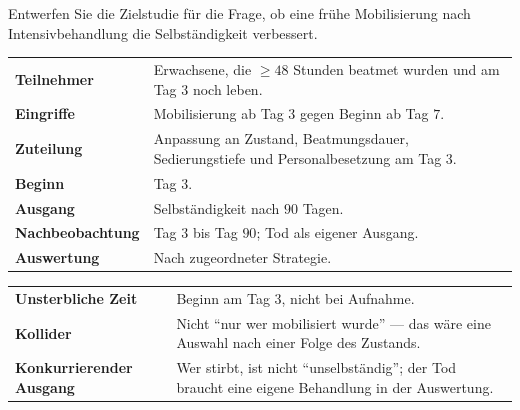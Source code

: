 \begin{aufgabe}
Entwerfen Sie die Zielstudie für die Frage, ob eine frühe Mobilisierung nach Intensivbehandlung die Selbständigkeit verbessert.

\loesung
{}
\begin{center}
{\small
\renewcommand{\arraystretch}{1.52}
\begin{tabular}{@{}P{3.0cm}P{5.6cm}@{}}
\toprule
\textbf{Teilnehmer} & Erwachsene, die $\ge 48$ Stunden beatmet wurden und am Tag $3$ noch leben.\\
\textbf{Eingriffe} & Mobilisierung ab Tag $3$ gegen Beginn ab Tag $7$.\\
\textbf{Zuteilung} & Anpassung an Zustand, Beatmungsdauer, Sedierungstiefe und Personalbesetzung am Tag $3$.\\
\textbf{Beginn} & Tag $3$.\\
\textbf{Ausgang} & Selbständigkeit nach $90$ Tagen.\\
\textbf{Nachbeobachtung} & Tag $3$ bis Tag $90$; Tod als eigener Ausgang.\\
\textbf{Auswertung} & Nach zugeordneter Strategie.\\
\bottomrule
\end{tabular}}
\end{center}

\begin{center}
{\small
\renewcommand{\arraystretch}{1.5}
\begin{tabular}{@{}P{3.4cm}P{5.2cm}@{}}
\toprule
\textbf{Unsterbliche Zeit} & Beginn am Tag $3$, nicht bei Aufnahme.\\
\textbf{Kollider} & Nicht \enquote{nur wer mobilisiert wurde} --- das wäre eine Auswahl nach einer Folge des Zustands.\\
\textbf{Konkurrieren\-der Ausgang} & Wer stirbt, ist nicht \enquote{unselbständig}; der Tod braucht eine eigene Behandlung in der Auswertung.\\
\bottomrule
\end{tabular}}
\end{center}

\begin{center}
\begin{minipage}{0.88\textwidth}
\end{minipage}
\end{center}
\end{aufgabe}

